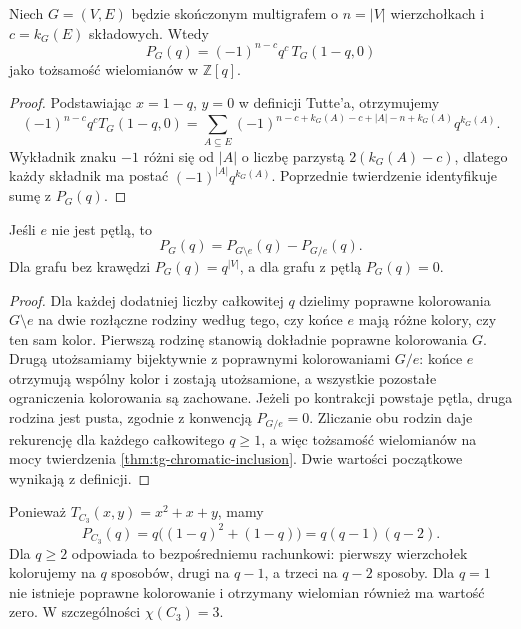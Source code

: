 \begin{twierdzenie}
\label{thm:tg-chrom-tutte}
Niech $G=(V,E)$ będzie skończonym multigrafem o $n=|V|$
wierzchołkach i $c=k_G(E)$ składowych. Wtedy
\[
P_G(q)=(-1)^{n-c}q^c\,T_G(1-q,0)
\]
jako tożsamość wielomianów w $\mathbb Z[q]$.
\end{twierdzenie}

\begin{proof}
Podstawiając $x=1-q$, $y=0$ w definicji Tutte'a,
otrzymujemy
\[
(-1)^{n-c}q^c T_G(1-q,0)
=\sum_{A\subseteq E}
 (-1)^{n-c+k_G(A)-c+|A|-n+k_G(A)}q^{k_G(A)}.
\]
Wykładnik znaku $-1$ różni się od $|A|$ o liczbę parzystą
$2(k_G(A)-c)$, dlatego każdy składnik ma postać
$(-1)^{|A|}q^{k_G(A)}$. Poprzednie twierdzenie
identyfikuje sumę z $P_G(q)$.
\end{proof}

\begin{wniosek}
\label{cor:tg-chrom-recursion}
Jeśli $e$ nie jest pętlą, to
\[
P_G(q)=P_{G\setminus e}(q)-P_{G/e}(q).
\]
Dla grafu bez krawędzi $P_G(q)=q^{|V|}$,
a dla grafu z pętlą $P_G(q)=0$.
\end{wniosek}
\begin{proof}
Dla każdej dodatniej liczby całkowitej $q$ dzielimy
poprawne kolorowania $G\setminus e$ na dwie rozłączne
rodziny według tego, czy końce $e$ mają różne kolory,
czy ten sam kolor. Pierwszą rodzinę stanowią dokładnie
poprawne kolorowania $G$. Drugą utożsamiamy bijektywnie
z poprawnymi kolorowaniami $G/e$: końce $e$ otrzymują
wspólny kolor i zostają utożsamione, a wszystkie
pozostałe ograniczenia kolorowania są zachowane.
Jeżeli po kontrakcji powstaje pętla, druga rodzina
jest pusta, zgodnie z konwencją $P_{G/e}=0$.
Zliczanie obu rodzin daje rekurencję dla każdego
całkowitego $q\ge1$, a więc tożsamość wielomianów
na mocy twierdzenia \ref{thm:tg-chromatic-inclusion}.
Dwie wartości początkowe wynikają z definicji.
\end{proof}

\begin{przyklad}
Ponieważ $T_{C_3}(x,y)=x^2+x+y$, mamy
\[
P_{C_3}(q)=q\bigl((1-q)^2+(1-q)\bigr)
=q(q-1)(q-2).
\]
Dla $q\ge2$ odpowiada to bezpośredniemu rachunkowi:
pierwszy wierzchołek kolorujemy na $q$ sposobów,
drugi na $q-1$, a trzeci na $q-2$ sposoby.
Dla $q=1$ nie istnieje poprawne kolorowanie
i otrzymany wielomian również ma wartość zero.
W szczególności $\chi(C_3)=3$.
\end{przyklad}

